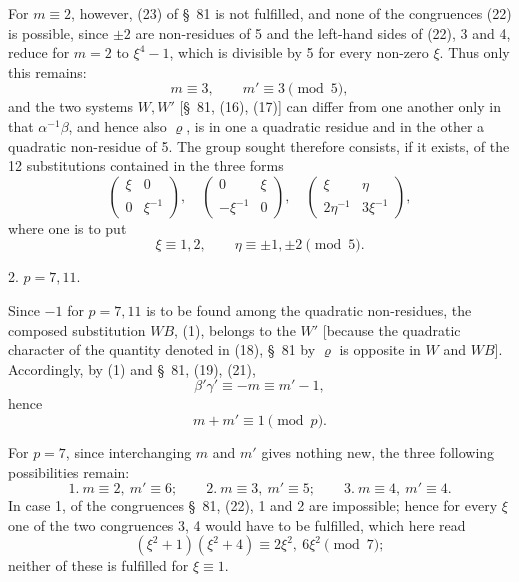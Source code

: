 \documentclass[11pt]{article}
\begin{document}
For $m\equiv2$, however, (23) of \S~81 is not fulfilled, and none of the congruences (22) is possible, since $\pm2$ are non-residues of 5 and the left-hand sides of (22), 3 and 4, reduce for $m=2$ to $\xi^4-1$, which is divisible by 5 for every non-zero $\xi$. Thus only this remains:
\begin{equation}
 m\equiv3,\qquad m'\equiv3\pmod5,
\tag{2}
\end{equation}
and the two systems $W,W'$ [\S~81, (16), (17)] can differ from one another only in that $\alpha^{-1}\beta$, and hence also $\varrho$, is in one a quadratic residue and in the other a quadratic non-residue of 5. The group sought therefore consists, if it exists, of the 12 substitutions contained in the three forms
\begin{equation}
 \begin{pmatrix}\xi&0\\0&\xi^{-1}\end{pmatrix},\quad
 \begin{pmatrix}0&\xi\\-\xi^{-1}&0\end{pmatrix},\quad
 \begin{pmatrix}\xi&\eta\\2\eta^{-1}&3\xi^{-1}\end{pmatrix},
\tag{3}
\end{equation}
where one is to put
\[
 \xi\equiv1,2,\qquad \eta\equiv\pm1,\pm2\pmod5.
\]

2. $p=7,11$.

Since $-1$ for $p=7,11$ is to be found among the quadratic non-residues, the composed substitution $WB$, (1), belongs to the $W'$ [because the quadratic character of the quantity denoted in (18), \S~81 by $\varrho$ is opposite in $W$ and $WB$]. Accordingly, by (1) and \S~81, (19), (21),
\[
 \beta'\gamma'\equiv -m\equiv m'-1,
\]
hence
\begin{equation}
 m+m'\equiv1\pmod p.
\tag{4}
\end{equation}

For $p=7$, since interchanging $m$ and $m'$ gives nothing new, the three following possibilities remain:
\[
 1.\ m\equiv2,\ m'\equiv6;\qquad
 2.\ m\equiv3,\ m'\equiv5;\qquad
 3.\ m\equiv4,\ m'\equiv4.
\]
In case 1, of the congruences \S~81, (22), 1 and 2 are impossible; hence for every $\xi$ one of the two congruences 3, 4 would have to be fulfilled, which here read
\[
 (\xi^2+1)(\xi^2+4)\equiv2\xi^2,\ 6\xi^2\pmod7;
\]
neither of these is fulfilled for $\xi\equiv1$.
\end{document}
